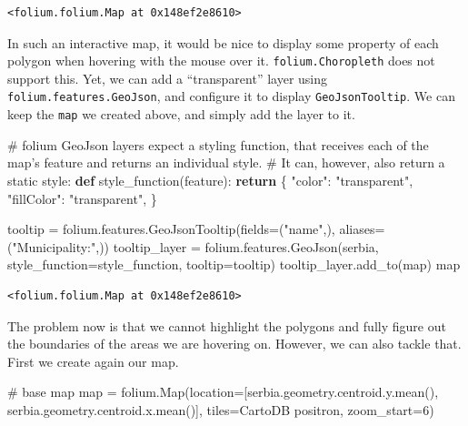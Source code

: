 \documentclass[
  letterpaper,
  DIV=11,
  numbers=noendperiod]{scrreprt}
\newenvironment{Shaded}{\begin{snugshade}}{\end{snugshade}}
\newcommand{\BuiltInTok}[1]{\textcolor[rgb]{0.00,0.23,0.31}{#1}}
\newcommand{\CommentTok}[1]{\textcolor[rgb]{0.37,0.37,0.37}{#1}}
\newcommand{\ControlFlowTok}[1]{\textcolor[rgb]{0.00,0.23,0.31}{\textbf{#1}}}
\newcommand{\DecValTok}[1]{\textcolor[rgb]{0.68,0.00,0.00}{#1}}
\newcommand{\KeywordTok}[1]{\textcolor[rgb]{0.00,0.23,0.31}{\textbf{#1}}}
\newcommand{\NormalTok}[1]{\textcolor[rgb]{0.00,0.23,0.31}{#1}}
\newcommand{\OperatorTok}[1]{\textcolor[rgb]{0.37,0.37,0.37}{#1}}
\newcommand{\StringTok}[1]{\textcolor[rgb]{0.13,0.47,0.30}{#1}}
\begin{document}
\begin{verbatim}
<folium.folium.Map at 0x148ef2e8610>
\end{verbatim}

In such an interactive map, it would be nice to display some property of
each polygon when hovering with the mouse over it.
\texttt{folium.Choropleth} does not support this. Yet, we can add a
``transparent'' layer using \texttt{folium.features.GeoJson}, and
configure it to display \texttt{GeoJsonTooltip}. We can keep the
\texttt{map} we created above, and simply add the layer to it.

\begin{Shaded}
\begin{Highlighting}[]
\CommentTok{\# folium GeoJson layers expect a styling function, that receives each of the map’s feature and returns  an individual style. }
\CommentTok{\# It can, however, also return a static style:}
\KeywordTok{def}\NormalTok{ style\_function(feature):}
    \ControlFlowTok{return}\NormalTok{ \{}
        \StringTok{"color"}\NormalTok{: }\StringTok{"transparent"}\NormalTok{,}
        \StringTok{"fillColor"}\NormalTok{: }\StringTok{"transparent"}\NormalTok{,}
\NormalTok{    \}}

\NormalTok{tooltip }\OperatorTok{=}\NormalTok{ folium.features.GeoJsonTooltip(fields}\OperatorTok{=}\NormalTok{(}\StringTok{"name"}\NormalTok{,), aliases}\OperatorTok{=}\NormalTok{(}\StringTok{"Municipality:"}\NormalTok{,))}
\NormalTok{tooltip\_layer }\OperatorTok{=}\NormalTok{ folium.features.GeoJson(serbia, style\_function}\OperatorTok{=}\NormalTok{style\_function, tooltip}\OperatorTok{=}\NormalTok{tooltip)}
\NormalTok{tooltip\_layer.add\_to(}\BuiltInTok{map}\NormalTok{)}
\BuiltInTok{map}
\end{Highlighting}
\end{Shaded}

\begin{verbatim}
<folium.folium.Map at 0x148ef2e8610>
\end{verbatim}

The problem now is that we cannot highlight the polygons and fully
figure out the boundaries of the areas we are hovering on. However, we
can also tackle that. First we create again our map.

\begin{Shaded}
\begin{Highlighting}[]
\CommentTok{\# base map}
\BuiltInTok{map} \OperatorTok{=}\NormalTok{ folium.Map(location}\OperatorTok{=}\NormalTok{[serbia.geometry.centroid.y.mean(), serbia.geometry.centroid.x.mean()], tiles}\OperatorTok{=}\StringTok{\textquotesingle{}CartoDB positron\textquotesingle{}}\NormalTok{, zoom\_start}\OperatorTok{=}\DecValTok{6}\NormalTok{)}
\end{Highlighting}
\end{Shaded}
\end{document}
